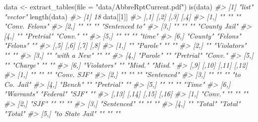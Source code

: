 \documentclass[
]{krantz}
\makeatletter
\newenvironment{Shaded}{\begin{snugshade}}{\end{snugshade}}
\newcommand{\AttributeTok}[1]{\textcolor[rgb]{0.61,0.61,0.61}{#1}}
\newcommand{\CommentTok}[1]{\textcolor[rgb]{0.37,0.37,0.37}{\textit{#1}}}
\newcommand{\DecValTok}[1]{\textcolor[rgb]{0.06,0.06,0.06}{#1}}
\newcommand{\FunctionTok}[1]{\textcolor[rgb]{0,0,0}{#1}}
\newcommand{\NormalTok}[1]{#1}
\newcommand{\OtherTok}[1]{\textcolor[rgb]{0.37,0.37,0.37}{#1}}
\newcommand{\StringTok}[1]{\textcolor[rgb]{0.5,0.5,0.5}{#1}}
\newenvironment{kframe}{%
\medskip{}
\setlength{\fboxsep}{.8em}
 \def\at@end@of@kframe{}%
 \ifinner\ifhmode%
  \def\at@end@of@kframe{\end{minipage}}%
  \begin{minipage}{\columnwidth}%
 \fi\fi%
 \def\FrameCommand##1{\hskip\@totalleftmargin \hskip-\fboxsep
 \colorbox{shadecolor}{##1}\hskip-\fboxsep
     \hskip-\linewidth \hskip-\@totalleftmargin \hskip\columnwidth}%
 \MakeFramed {\advance\hsize-\width
   \@totalleftmargin\z@ \linewidth\hsize
   \@setminipage}}%
 {\par\unskip\endMakeFramed%
 \at@end@of@kframe}
\renewenvironment{Shaded}{\begin{kframe}}{\end{kframe}}
\makeatother
\begin{document}
\begin{Shaded}
\begin{Highlighting}[]
\NormalTok{data }\OtherTok{\textless{}{-}} \FunctionTok{extract\_tables}\NormalTok{(}\AttributeTok{file =} \StringTok{"data/AbbreRptCurrent.pdf"}\NormalTok{)}
\FunctionTok{is}\NormalTok{(data)}
\CommentTok{\#\textgreater{} [1] "list"   "vector"}
\FunctionTok{length}\NormalTok{(data)}
\CommentTok{\#\textgreater{} [1] 18}
\NormalTok{data[[}\DecValTok{1}\NormalTok{]]}
\CommentTok{\#\textgreater{}      [,1]     [,2]       [,3]     [,4]          }
\CommentTok{\#\textgreater{} [1,] ""       ""         ""       "Conv. Felons"}
\CommentTok{\#\textgreater{} [2,] ""       ""         ""       "Sentenced to"}
\CommentTok{\#\textgreater{} [3,] ""       ""         ""       "County Jail" }
\CommentTok{\#\textgreater{} [4,] ""       "Pretrial" "Conv."  ""            }
\CommentTok{\#\textgreater{} [5,] ""       ""         ""       "time"        }
\CommentTok{\#\textgreater{} [6,] "County" "Felons"   "Felons" ""            }
\CommentTok{\#\textgreater{}      [,5]        [,6]         [,7]       [,8]   }
\CommentTok{\#\textgreater{} [1,] ""          "Parole"     ""         ""     }
\CommentTok{\#\textgreater{} [2,] ""          "Violators"  ""         ""     }
\CommentTok{\#\textgreater{} [3,] ""          "with a New" ""         ""     }
\CommentTok{\#\textgreater{} [4,] "Parole"    ""           "Pretrial" "Conv."}
\CommentTok{\#\textgreater{} [5,] ""          "Charge"     ""         ""     }
\CommentTok{\#\textgreater{} [6,] "Violators" ""           "Misd."    "Misd."}
\CommentTok{\#\textgreater{}      [,9]       [,10]     [,11]      [,12]        }
\CommentTok{\#\textgreater{} [1,] ""         ""        ""         "Conv. SJF"  }
\CommentTok{\#\textgreater{} [2,] ""         ""        ""         "Sentenced"  }
\CommentTok{\#\textgreater{} [3,] ""         ""        ""         "to Co. Jail"}
\CommentTok{\#\textgreater{} [4,] "Bench"    ""        "Pretrial" ""           }
\CommentTok{\#\textgreater{} [5,] ""         ""        ""         "Time"       }
\CommentTok{\#\textgreater{} [6,] "Warrants" "Federal" "SJF"      ""           }
\CommentTok{\#\textgreater{}      [,13]           [,14]    [,15]   [,16]     }
\CommentTok{\#\textgreater{} [1,] "Conv."         ""       ""      ""        }
\CommentTok{\#\textgreater{} [2,] "SJF"           ""       ""      ""        }
\CommentTok{\#\textgreater{} [3,] "Sentenced"     ""       ""      ""        }
\CommentTok{\#\textgreater{} [4,] ""              "Total"  "Total" "Total"   }
\CommentTok{\#\textgreater{} [5,] "to State Jail" ""       ""      ""        }

\end{Highlighting}
\end{Shaded}
\end{document}
